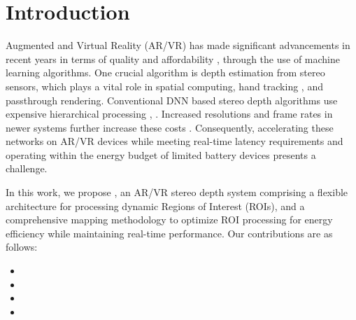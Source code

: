 \section{Introduction}\label{sec:intro}

Augmented and Virtual Reality (AR/VR) has made significant advancements in recent years in terms of quality and affordability \cite{meta_motiv1, meta_motiv2}, through the use of machine learning algorithms.
One crucial algorithm is depth estimation from stereo sensors, which plays a vital role in spatial computing, hand tracking \cite{depth_gesture_recog}, and %
passthrough rendering.
Conventional DNN based stereo depth algorithms use expensive hierarchical processing \cite{stereonet, mobilestereonet, hitnet}, 
.
Increased resolutions and frame rates in newer systems further increase these costs \cite{near_sensor_distributed}.
Consequently, accelerating these networks on AR/VR devices while meeting real-time latency requirements and operating within the energy budget of limited battery devices presents a challenge.

In this work, we propose \textit{\projname{}}, an AR/VR stereo depth system comprising a flexible architecture for processing dynamic Regions of Interest (ROIs), and a comprehensive mapping methodology to optimize ROI processing for energy efficiency while maintaining real-time performance. Our contributions are as follows:

\begin{itemize}[leftmargin=*]
    \item {}
    \item {}
    \item {}
    \item {}
\end{itemize}

